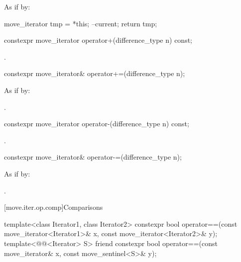 \begin{itemdescr}
\pnum
\effects
As if by:
\begin{codeblock}
move_iterator tmp = *this;
--current;
return tmp;
\end{codeblock}
\end{itemdescr}

%
\begin{itemdecl}
constexpr move_iterator operator+(difference_type n) const;
\end{itemdecl}

\begin{itemdescr}
\pnum
\returns
{}.
\end{itemdescr}

%
\begin{itemdecl}
constexpr move_iterator& operator+=(difference_type n);
\end{itemdecl}

\begin{itemdescr}
\pnum
\effects
As if by: 

\pnum
\returns
{}.
\end{itemdescr}

%
\begin{itemdecl}
constexpr move_iterator operator-(difference_type n) const;
\end{itemdecl}

\begin{itemdescr}
\pnum
\returns
{}.
\end{itemdescr}

%
\begin{itemdecl}
constexpr move_iterator& operator-=(difference_type n);
\end{itemdecl}

\begin{itemdescr}
\pnum
\effects
As if by: 

\pnum
\returns
{}.
\end{itemdescr}

[move.iter.op.comp]{Comparisons}

%
\begin{itemdecl}
template<class Iterator1, class Iterator2>
  constexpr bool operator==(const move_iterator<Iterator1>& x,
                            const move_iterator<Iterator2>& y);
template<@@<Iterator> S>
  friend constexpr bool operator==(const move_iterator& x,
                                   const move_sentinel<S>& y);
\end{itemdecl}

